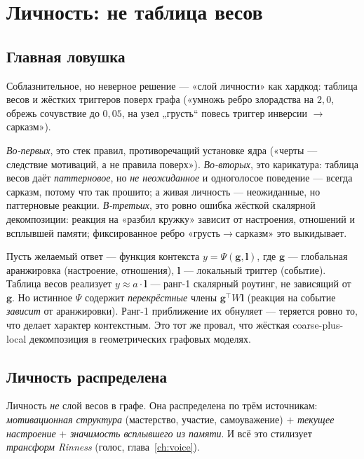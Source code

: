 \chapter{Личность: не таблица весов}
\label{ch:personality}

\section{Главная ловушка}

Соблазнительное, но неверное решение — «слой личности» как хардкод: таблица весов и
жёстких триггеров поверх графа («умножь ребро злорадства на $2{,}0$, обрежь сочувствие
до $0{,}05$, на узел „грусть“ повесь триггер инверсии $\to$ сарказм»).

\begin{pitfall}
\emph{Во-первых}, это стек правил, противоречащий установке ядра («черты — следствие
мотиваций, а не правила поверх»). \emph{Во-вторых}, это карикатура: таблица весов
даёт \emph{паттерновое}, но \emph{не неожиданное} и одноголосое поведение — всегда
сарказм, потому что так прошито; а живая личность — неожиданные, но паттерновые
реакции. \emph{В-третьих}, это ровно ошибка жёсткой скалярной декомпозиции: реакция
на «разбил кружку» зависит от настроения, отношений и всплывшей памяти; фиксированное
ребро «грусть$\to$сарказм» это выкидывает.
\end{pitfall}

\begin{workedbox}
Пусть желаемый ответ — функция контекста $y=\Psi(\mathbf{g},\mathbf{l})$, где
$\mathbf{g}$ — глобальная аранжировка (настроение, отношения), $\mathbf{l}$ —
локальный триггер (событие). Таблица весов реализует $y\approx a\cdot\mathbf{l}$ —
ранг-1 скалярный роутинг, не зависящий от $\mathbf{g}$. Но истинное $\Psi$ содержит
\emph{перекрёстные} члены $\mathbf{g}^\top W \mathbf{l}$ (реакция на событие
\emph{зависит} от аранжировки). Ранг-1 приближение их обнуляет — теряется ровно то,
что делает характер контекстным. Это тот же провал, что жёсткая coarse-plus-local
декомпозиция в геометрических графовых моделях.
\end{workedbox}

\section{Личность распределена}

Личность \emph{не} слой весов в графе. Она распределена по трём источникам:
\emph{мотивационная структура} (мастерство, участие, самоуважение) $+$ \emph{текущее
настроение} $+$ \emph{значимость всплывшего из памяти}. И всё это стилизует
\emph{трансформ Rinness} (голос, глава~\ref{ch:voice}).

